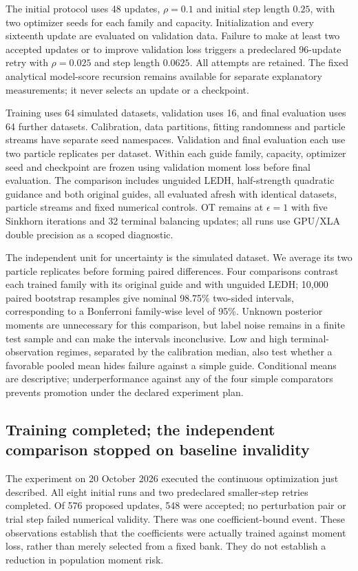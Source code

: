 The initial protocol uses 48 updates, $\rho=0.1$ and initial step length
$0.25$, with two optimizer seeds for each family and capacity. Initialization
and every sixteenth update are evaluated on validation data. Failure to make
at least two accepted updates or to improve validation loss triggers a
predeclared 96-update retry with $\rho=0.025$ and step length $0.0625$.
All attempts are retained. The fixed analytical model-score recursion remains
available for separate explanatory measurements; it never selects an update
or a checkpoint.

Training uses 64 simulated datasets, validation uses 16, and final evaluation
uses 64 further datasets. Calibration, data partitions, fitting randomness
and particle streams have separate seed namespaces. Validation and final
evaluation each use two particle replicates per dataset. Within each guide
family, capacity, optimizer seed and checkpoint are frozen using validation moment
loss before final evaluation. The comparison includes unguided LEDH,
half-strength quadratic guidance and both original guides, all evaluated
afresh with identical datasets, particle streams and fixed numerical controls.
OT remains at $\epsilon=1$ with five Sinkhorn iterations and 32 terminal
balancing updates; all runs use GPU/XLA double precision as a scoped
diagnostic.

The independent unit for uncertainty is the simulated dataset. We average its
two particle replicates before forming paired differences. Four comparisons
contrast each trained family with its original guide and with unguided LEDH;
10,000 paired bootstrap resamples give nominal 98.75\% two-sided intervals,
corresponding to a Bonferroni family-wise level of 95\%. Unknown posterior
moments are unnecessary for this comparison, but label noise remains in a
finite test sample and can make the intervals inconclusive. Low and high
terminal-observation regimes, separated by the calibration median, also test
whether a favorable pooled mean hides failure against a simple guide.
Conditional means are descriptive; underperformance against any of the four
simple comparators prevents promotion under the declared experiment plan.

\subsection{Training completed; the independent comparison stopped on baseline invalidity}
\label{sec:sg-moment-training-result}

The experiment on 20 October 2026 executed the continuous optimization just
described. All eight initial runs and two predeclared smaller-step retries
completed. Of 576 proposed updates, 548 were accepted; no perturbation pair
or trial step failed numerical validity. There was one coefficient-bound
event. These observations establish that the coefficients were actually
trained against moment loss, rather than merely selected from a fixed bank.
They do not establish a reduction in population moment risk.

